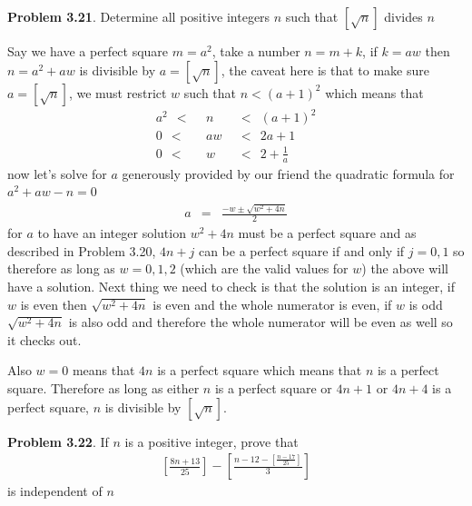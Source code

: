 \documentclass[aps,preprint,preprintnumbers,nofootinbib,showpacs,prd]{revtex4-1}
\newcommand{\nbea}{\begin{eqnarray*}}
\newcommand{\neea}{\end{eqnarray*}}
\begin{document}
{\bf Problem 3.21}. Determine all positive integers $n$ such that $[\sqrt{n}]$ divides $n$

Say we have a perfect square $m = a^2$, take a number $n=m+k$, if $k = aw$ then $n=a^2+aw$ is divisible by $a=[\sqrt{n}]$, the caveat here is that to make sure $a = [\sqrt{n}]$, we must restrict $w$ such that $n < (a+1)^2$ which means that
%
\nbea
a^2 ~~<~~& n & ~~<~~ (a+1)^2 \\
0 ~~<~~ & aw & ~~<~~ 2a + 1 \\
0 ~~<~~ & w & ~~<~~ 2 + \frac{1}{a}
\neea
%
now let's solve for $a$ generously provided by our friend the quadratic formula for $a^2 + aw - n = 0$
%
\nbea
a & = & \frac{-w\pm\sqrt{w^2+4n}}{2}
\neea
%
for $a$ to have an integer solution $w^2+4n$ must be a perfect square and as described in Problem 3.20, $4n+j$ can be a perfect square if and only if $j=0,1$ so therefore as long as $w=0,1,2$ (which are the valid values for $w$) the above will have a solution. Next thing we need to check is that the solution is an integer, if $w$ is even then $\sqrt{w^2 + 4n}$ is even and the whole numerator is even, if $w$ is odd $\sqrt{w^2 + 4n}$ is also odd and therefore the whole numerator will be even as well so it checks out.

Also $w=0$ means that $4n$ is a perfect square which means that $n$ is a perfect square. Therefore as long as either $n$ is a perfect square or $4n+1$ or $4n+4$ is a perfect square, $n$ is divisible by $[\sqrt{n}]$.

{\bf Problem 3.22}. If $n$ is a positive integer, prove that
%
\nbea
\left \lbrack \frac{8n + 13}{25} \right \rbrack - \left \lbrack \frac{n - 12 - \left \lbrack \frac{n-17}{25}\right \rbrack}{3} \right \rbrack
\neea
%
is independent of $n$
\end{document}
